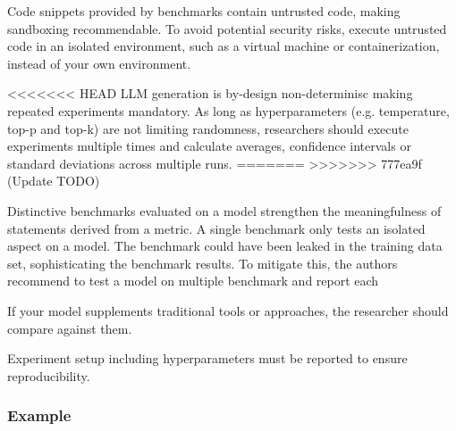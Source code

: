 \documentclass[11pt]{article}
\begin{document}
Code snippets provided by benchmarks contain untrusted code, making sandboxing recommendable.
To avoid potential security risks, execute untrusted code in an isolated environment, such as a virtual machine or containerization, instead of your own environment.

<<<<<<< HEAD
LLM generation is by-design non-determinisc making repeated experiments mandatory. %
As long as hyperparameters (e.g. temperature, top-p and top-k) are not limiting randomness, researchers should execute experiments multiple times and calculate averages, confidence intervals or standard deviations across multiple runs.
=======
>>>>>>> 777ea9f (Update TODO)

Distinctive benchmarks evaluated on a model strengthen the meaningfulness of statements derived from a metric.
A single benchmark only tests an isolated aspect on a model.
The benchmark could have been leaked in the training data set, sophisticating the benchmark results.
To mitigate this, the authors recommend to test a model on multiple benchmark and report each

If your model supplements traditional tools or approaches, the researcher should compare against them.



Experiment setup including hyperparameters must be reported to ensure reproducibility.


\subsubsection{Example}
\end{document}
